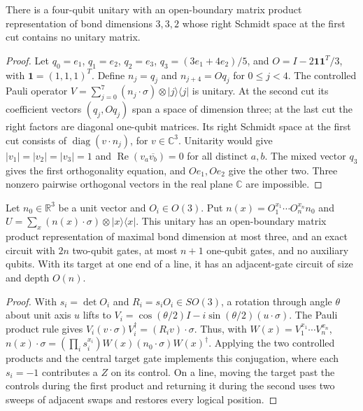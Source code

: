 \begin{lemma}
    \label{thm:mpu_pauli_control_schmidt_obstruction}
    There is a four-qubit unitary with an open-boundary matrix product
    representation of bond dimensions $3,3,2$ whose right Schmidt
    space at the first cut contains no unitary matrix.
\end{lemma}
\begin{proof}
    Let $q_0=e_1$, $q_1=e_2$, $q_2=e_3$,
    $q_3=(3e_1+4e_2)/5$, and
    $O=I-2\mathbf 1\mathbf 1^T/3$, with $\mathbf 1=(1,1,1)^T$.
    Define $n_j=q_j$ and $n_{j+4}=Oq_j$ for $0\leq j<4$.
    The controlled Pauli operator
    $V=\sum_{j=0}^7(n_j\cdot\sigma)\otimes|j\rangle\langle j|$
    is unitary. At the second cut its coefficient vectors
    $(q_j,Oq_j)$ span a space of dimension three; at the last cut
    the right factors are diagonal one-qubit matrices.
    Its right Schmidt space at the first cut consists of
    $\operatorname{diag}(v\cdot n_j)$, for $v\in\mathbb C^3$.
    Unitarity would give $|v_1|=|v_2|=|v_3|=1$ and
    $\operatorname{Re}(v_a\overline{v_b})=0$ for all distinct $a,b$.
    The mixed vector $q_3$ gives the first orthogonality equation,
    and $Oe_1,Oe_2$ give the other two. Three nonzero pairwise
    orthogonal vectors in the real plane $\mathbb C$ are impossible.
\end{proof}

\begin{lemma}
    \label{thm:mpu_orthogonal_walk_circuits}
    Let $n_0\in\mathbb R^3$ be a unit vector and $O_i\in O(3)$.
    Put $n(x)=O_1^{x_1}\cdots O_n^{x_n}n_0$ and
    $U=\sum_x(n(x)\cdot\sigma)\otimes|x\rangle\langle x|$.
    This unitary has an open-boundary matrix product representation
    of maximal bond dimension at most three, and an exact circuit
    with $2n$ two-qubit gates, at most $n+1$ one-qubit gates, and
    no auxiliary qubits. With its target at one end of a line,
    it has an adjacent-gate circuit of size and depth $O(n)$.
\end{lemma}
\begin{proof}
    With $s_i=\det O_i$ and $R_i=s_iO_i\in SO(3)$,
    a rotation through angle $\theta$ about unit axis $u$ lifts to
    $V_i=\cos(\theta/2)I-i\sin(\theta/2)(u\cdot\sigma)$.
    The Pauli product rule gives
    $V_i(v\cdot\sigma)V_i^\dagger=(R_iv)\cdot\sigma$.
    Thus, with $W(x)=V_1^{x_1}\cdots V_n^{x_n}$,
    $n(x)\cdot\sigma=(\prod_i s_i^{x_i})
        W(x)(n_0\cdot\sigma)W(x)^\dagger$.
    Applying the two controlled products and the central target gate implements this conjugation, where
    each $s_i=-1$ contributes a $Z$ on its control.
    On a line, moving the target past the controls during the first
    product and returning it during the second uses two sweeps of
    adjacent swaps and restores every logical position.
\end{proof}

